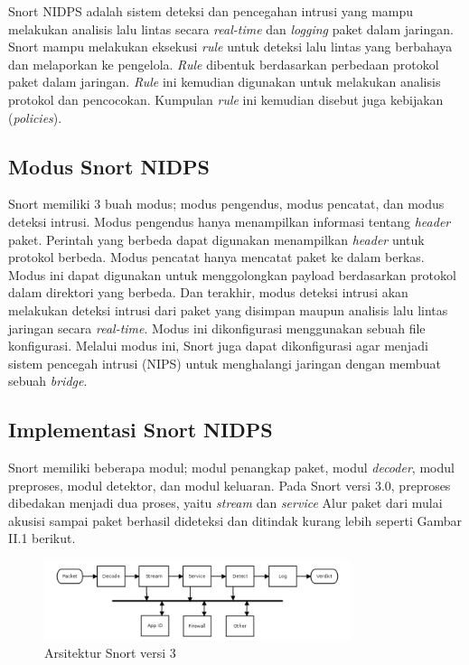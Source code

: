     Snort NIDPS adalah sistem deteksi dan pencegahan intrusi yang mampu melakukan analisis lalu lintas secara \emph{real-time} dan \emph{logging} paket dalam jaringan. Snort mampu melakukan eksekusi \emph{rule} untuk deteksi lalu lintas yang berbahaya dan melaporkan ke pengelola. \emph{Rule} dibentuk berdasarkan perbedaan protokol paket dalam jaringan. \emph{Rule} ini kemudian digunakan untuk melakukan analisis protokol dan pencocokan. Kumpulan \emph{rule} ini kemudian disebut juga kebijakan (\emph{policies}). 

  \subsection{Modus Snort NIDPS}

    Snort memiliki 3 buah modus; modus pengendus, modus pencatat, dan modus deteksi intrusi. Modus pengendus hanya menampilkan informasi tentang \emph{header} paket. Perintah yang berbeda dapat digunakan menampilkan \emph{header} untuk protokol berbeda. Modus pencatat hanya mencatat paket ke dalam berkas. Modus ini dapat digunakan untuk menggolongkan payload berdasarkan protokol dalam direktori yang berbeda. Dan terakhir, modus deteksi intrusi akan melakukan deteksi intrusi dari paket yang disimpan maupun analisis lalu lintas jaringan secara \emph{real-time}. Modus ini dikonfigurasi menggunakan sebuah file konfigurasi. Melalui modus ini, Snort juga dapat dikonfigurasi agar menjadi sistem pencegah intrusi (NIPS) untuk menghalangi jaringan dengan membuat sebuah \emph{bridge}.

  \subsection{Implementasi Snort NIDPS}

    Snort memiliki beberapa modul; modul penangkap paket, modul \emph{decoder}, modul preproses, modul detektor, dan modul keluaran. Pada Snort versi 3.0, preproses dibedakan menjadi dua proses, yaitu \emph{stream} dan \emph{service} Alur paket dari mulai akusisi sampai paket berhasil dideteksi dan ditindak kurang lebih seperti Gambar II.1 berikut.
    
    \begin{figure}[htb]
      \centering
      \includegraphics[width=0.8\textwidth]{resources/snort3.png}
      \caption[Arsitektur Snort versi 3]{Arsitektur Snort versi 3}
    \end{figure}
    
